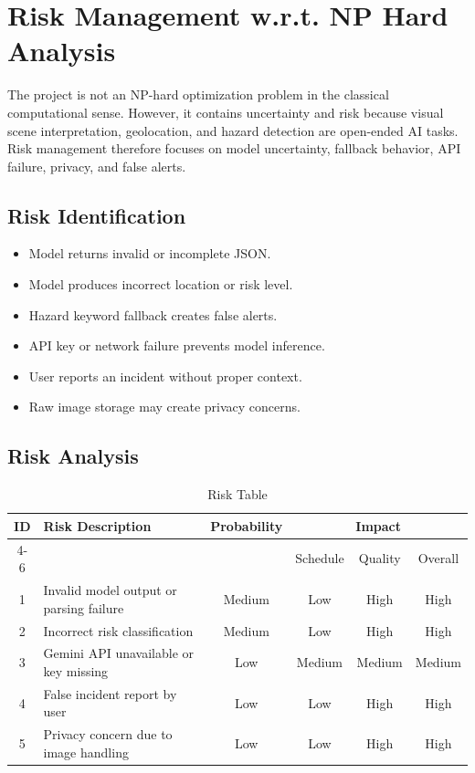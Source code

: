 \section{Risk Management w.r.t. NP Hard Analysis}
The project is not an NP-hard optimization problem in the classical computational sense. However, it contains uncertainty and risk because visual scene interpretation, geolocation, and hazard detection are open-ended AI tasks. Risk management therefore focuses on model uncertainty, fallback behavior, API failure, privacy, and false alerts.

\subsection{Risk Identification}
\begin{itemize}
\item Model returns invalid or incomplete JSON.
\item Model produces incorrect location or risk level.
\item Hazard keyword fallback creates false alerts.
\item API key or network failure prevents model inference.
\item User reports an incident without proper context.
\item Raw image storage may create privacy concerns.
\end{itemize}

\subsection{Risk Analysis}
\begin{table}[H]
\begin{center}
\caption{Risk Table}
\label{tab:risk}
\def\arraystretch{1.4}
\begin{tabularx}{\textwidth}{|c|X|c|c|c|c|}
\hline
\multirow{2}{*}{ID} & \multirow{2}{*}{Risk Description} & \multirow{2}{*}{Probability} & \multicolumn{3}{|c|}{Impact} \\ \cline{4-6}
 & & & Schedule & Quality & Overall \\ \hline
1 & Invalid model output or parsing failure & Medium & Low & High & High \\ \hline
2 & Incorrect risk classification & Medium & Low & High & High \\ \hline
3 & Gemini API unavailable or key missing & Low & Medium & Medium & Medium \\ \hline
4 & False incident report by user & Low & Low & High & High \\ \hline
5 & Privacy concern due to image handling & Low & Low & High & High \\ \hline
\end{tabularx}
\end{center}
\end{table}

